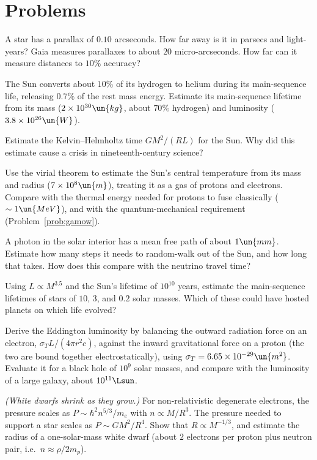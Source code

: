 \section{Problems}

\begin{problems}
\core A star has a parallax of $0.10$ arcseconds. How far away is it in parsecs and light-years? Gaia measures parallaxes to about $20$ micro-arcseconds. How far can it measure distances to $10\%$ accuracy?

\core The Sun converts about $10\%$ of its hydrogen to helium during its main-sequence life, releasing $0.7\%$ of the rest mass energy. Estimate its main-sequence lifetime from its mass ($2\times10^{30}\un{kg}$, about $70\%$ hydrogen) and luminosity ($3.8\times10^{26}\un{W}$).

 Estimate the Kelvin--Helmholtz time $GM^2/(RL)$ for the Sun. Why did this estimate cause a crisis in nineteenth-century science?

\core \label{prob:virial} Use the virial theorem to estimate the Sun's central temperature from its mass and radius ($7\times10^{8}\un{m}$), treating it as a gas of protons and electrons. Compare with the thermal energy needed for protons to fuse classically ($\sim1\un{MeV}$), and with the quantum-mechanical requirement (Problem~\ref{prob:gamow}).

 \label{prob:photon-walk} A photon in the solar interior has a mean free path of about $1\un{mm}$. Estimate how many steps it needs to random-walk out of the Sun, and how long that takes. How does this compare with the neutrino travel time?

 Using $L\propto M^{3.5}$ and the Sun's lifetime of $10^{10}$ years, estimate the main-sequence lifetimes of stars of $10$, $3$, and $0.2$ solar masses. Which of these could have hosted planets on which life evolved?

\core \label{prob:eddington} Derive the Eddington luminosity by balancing the outward radiation force on an electron, $\sigma_TL/(4\pi r^2c)$, against the inward gravitational force on a proton (the two are bound together electrostatically), using $\sigma_T = 6.65\times10^{-29}\un{m^2}$. Evaluate it for a black hole of $10^9$ solar masses, and compare with the luminosity of a large galaxy, about $10^{11}\Lsun$.

 \label{prob:wd} \emph{(White dwarfs shrink as they grow.)} For non-relativistic degenerate electrons, the pressure scales as $P\sim\hbar^2n^{5/3}/m_e$ with $n\propto M/R^3$. The pressure needed to support a star scales as $P\sim GM^2/R^4$. Show that $R\propto M^{-1/3}$, and estimate the radius of a one-solar-mass white dwarf (about $2$ electrons per proton plus neutron pair, i.e.\ $n\approx\rho/2m_p$).


\end{problems}
